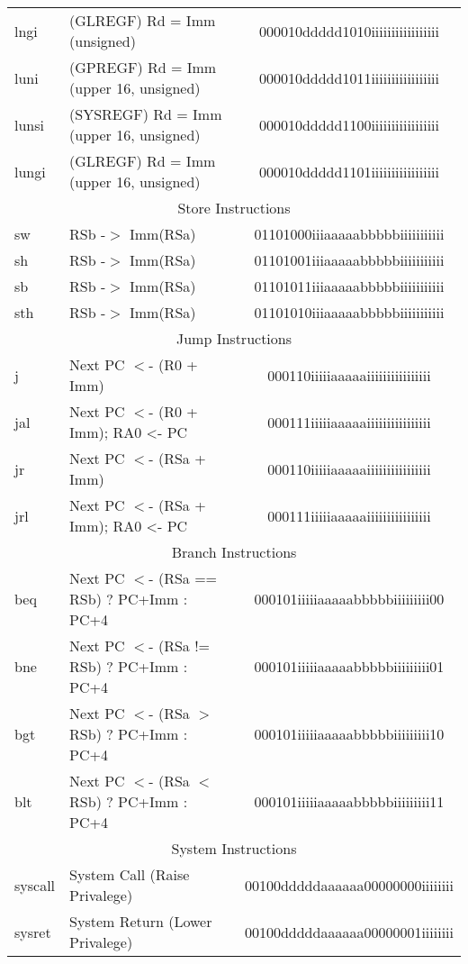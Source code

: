 \documentclass[letterpaper, 11pt]{article}
\begin{document}
\begin{center}
\begin{longtable}{|l|l|c|}
			lngi		& (GLREGF) Rd = Imm (unsigned)					& 000010ddddd1010iiiiiiiiiiiiiiiii \\
			luni		& (GPREGF) Rd = Imm	 (upper 16, unsigned)		& 000010ddddd1011iiiiiiiiiiiiiiiii \\
			lunsi		& (SYSREGF) Rd = Imm (upper 16, unsigned)		& 000010ddddd1100iiiiiiiiiiiiiiiii \\
			lungi		& (GLREGF) Rd = Imm	(upper 16, unsigned)		& 000010ddddd1101iiiiiiiiiiiiiiiii \\
			\hline
			\multicolumn{3}{|c|}{Store Instructions} \\ \hline

			sw			& RSb -$>$ Imm(RSa)								& 01101000iiiaaaaabbbbbiiiiiiiiiii\\
			sh			& RSb -$>$ Imm(RSa)								& 01101001iiiaaaaabbbbbiiiiiiiiiii\\
			sb			& RSb -$>$ Imm(RSa)								& 01101011iiiaaaaabbbbbiiiiiiiiiii\\
			sth			& RSb -$>$ Imm(RSa)								& 01101010iiiaaaaabbbbbiiiiiiiiiii\\
			\hline
			\multicolumn{3}{|c|}{Jump Instructions} \\ \hline		
			j			& Next PC $<$- (R0 + Imm)						& 000110iiiiiaaaaaiiiiiiiiiiiiiiii\\
			jal			& Next PC $<$- (R0 + Imm); RA0 <- PC 			& 000111iiiiiaaaaaiiiiiiiiiiiiiiii\\
			jr			& Next PC $<$- (RSa + Imm)						& 000110iiiiiaaaaaiiiiiiiiiiiiiiii\\
			jrl			& Next PC $<$- (RSa + Imm); RA0 <- PC			& 000111iiiiiaaaaaiiiiiiiiiiiiiiii\\
			\hline
			\multicolumn{3}{|c|}{Branch Instructions} \\ \hline
			beq			& Next PC $<$- (RSa == RSb) ? PC+Imm : PC+4		& 000101iiiiiaaaaabbbbbiiiiiiiii00\\
			bne			& Next PC $<$- (RSa != RSb) ? PC+Imm : PC+4		& 000101iiiiiaaaaabbbbbiiiiiiiii01\\
			bgt			& Next PC $<$- (RSa $>$ RSb) ? PC+Imm : PC+4	& 000101iiiiiaaaaabbbbbiiiiiiiii10\\
			blt			& Next PC $<$- (RSa $<$ RSb) ? PC+Imm : PC+4	& 000101iiiiiaaaaabbbbbiiiiiiiii11\\
			\hline
			\multicolumn{3}{|c|}{System Instructions} \\ \hline
			syscall		& System Call (Raise Privalege)					& 00100dddddaaaaaa00000000iiiiiiii\\
			sysret		& System Return (Lower Privalege)				& 00100dddddaaaaaa00000001iiiiiiii\\

\end{longtable}
\end{center}
\end{document}
